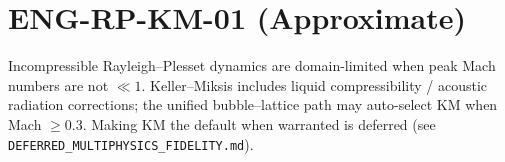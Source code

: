 \documentclass{article}
\begin{document}
\section*{ENG-RP-KM-01 (Approximate)}
Incompressible Rayleigh--Plesset dynamics are domain-limited when peak Mach
numbers are not $\ll 1$. Keller--Miksis includes liquid compressibility /
acoustic radiation corrections; the unified bubble--lattice path may auto-select
KM when Mach $\ge 0.3$. Making KM the default when warranted is deferred
(see \texttt{DEFERRED\_MULTIPHYSICS\_FIDELITY.md}).
\end{document}
